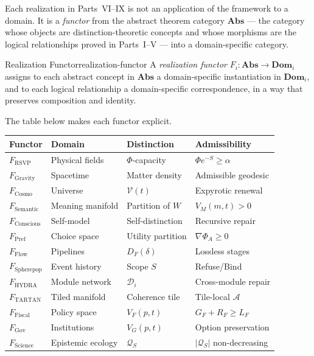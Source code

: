 \documentclass[12pt,twoside,openright]{book}
\newcommand{\adm}{\mathcal{A}}
\begin{document}
Each realization in Parts~VI--IX is not an application
of the framework to a domain. It is a \emph{functor}
from the abstract theorem category $\mathbf{Abs}$ —
the category whose objects are distinction-theoretic
concepts and whose morphisms are the logical relationships
proved in Parts~I--V — into a domain-specific category.

\begin{definition}{Realization Functor}{realization-functor}
  A \emph{realization functor}
  $F_i : \mathbf{Abs} \to \mathbf{Dom}_i$
  assigns to each abstract concept in $\mathbf{Abs}$
  a domain-specific instantiation in $\mathbf{Dom}_i$,
  and to each logical relationship a domain-specific
  correspondence, in a way that preserves composition
  and identity.
\end{definition}

The table below makes each functor explicit.

\begin{center}
\begin{tabular}{llll}
\toprule
Functor & Domain & Distinction & Admissibility \\
\midrule
$F_\mathrm{RSVP}$ & Physical fields &
  $\Phi$-capacity & $\Phi e^{-S} \ge \alpha$ \\
$F_\mathrm{Gravity}$ & Spacetime &
  Matter density & Admissible geodesic \\
$F_\mathrm{Cosmo}$ & Universe &
  $\mathcal{V}(t)$ & Expyrotic renewal \\
$F_\mathrm{Semantic}$ & Meaning manifold &
  Partition of $W$ & $V_M(m,t) > 0$ \\
$F_\mathrm{Conscious}$ & Self-model &
  Self-distinction & Recursive repair \\
$F_\mathrm{Pref}$ & Choice space &
  Utility partition & $\nabla\Phi_A \ge 0$ \\
$F_\mathrm{Flow}$ & Pipelines &
  $D_F(\delta)$ & Lossless stages \\
$F_\mathrm{Spherepop}$ & Event history &
  Scope $S$ & Refuse/Bind \\
$F_\mathrm{HYDRA}$ & Module network &
  $\mathcal{D}_i$ & Cross-module repair \\
$F_\mathrm{TARTAN}$ & Tiled manifold &
  Coherence tile & Tile-local $\adm$ \\
$F_\mathrm{Fiscal}$ & Policy space &
  $V_F(p,t)$ & $G_F+R_F \ge L_F$ \\
$F_\mathrm{Gov}$ & Institutions &
  $V_G(p,t)$ & Option preservation \\
$F_\mathrm{Science}$ & Epistemic ecology &
  $\mathcal{Q}_S$ & $|\mathcal{Q}_S|$ non-decreasing \\
\bottomrule
\end{tabular}
\end{center}
\end{document}
